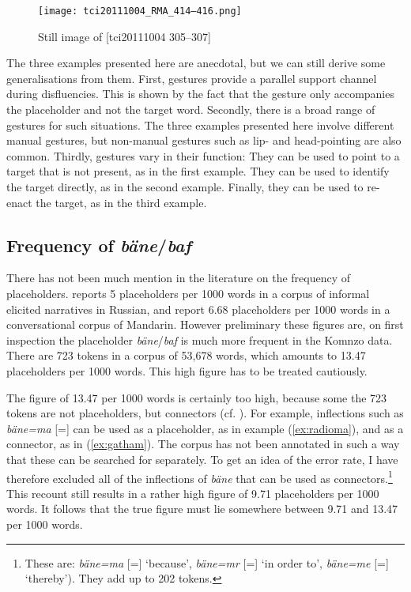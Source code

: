 \documentclass[output=paper,colorlinks,citecolor=brown]{langscibook}
\begin{document}
\begin{figure}
    \texttt{[image: tci20111004\_RMA\_414–416.png]}
    \caption{Still image of [tci20111004  305--307]}
    \label{fig:doehler:pictask-1-still}
\end{figure}

The three examples presented here are anecdotal, but we can still derive some generalisations from them. First, gestures provide a parallel support channel during disfluencies. This is shown by the fact that the gesture only accompanies the placeholder and not the target word. Secondly, there is a broad range of gestures for such situations. The three examples presented here involve different manual gestures, but non-manual gestures such as lip- and head-pointing are also common. Thirdly, gestures vary in their function: They can be used to point to a target that is not present, as in the first example. They can be used to identify the target directly, as in the second example. Finally, they can be used to re-enact the target, as in the third example.

\subsection{Frequency of \textit{bäne}/\textit{baf}}\label{sec:doehler:freq}

There has not been much mention in the literature on the frequency of placeholders. \textcite{Podlesskaya:2010aa} reports 5 placeholders per 1000 words in a corpus of informal elicited narratives in Russian, and \textcite{Zhao:2010sf} report 6.68 placeholders per 1000 words in a conversational corpus of Mandarin. However preliminary these figures are, on first inspection the placeholder \textit{bäne}/\textit{baf} is much more frequent in the Komnzo data. There are 723 tokens in a corpus of 53,678 words, which amounts to 13.47 placeholders per 1000 words. This high figure has to be treated cautiously.

The figure of 13.47 per 1000 words is certainly too high, because some the 723 tokens are not placeholders, but connectors (cf. ). For example, inflections such as \textit{bäne=ma} [=] can be used as a placeholder, as in example (\ref{ex:radioma}), and as a connector, as in (\ref{ex:gatham}). The corpus has not been annotated in such a way that these can be searched for separately. To get an idea of the error rate, I have therefore excluded all of the inflections of \textit{bäne} that can be used as connectors.\footnote{These are: \textit{bäne=ma} [=] `because', \textit{bäne=mr} [=] `in order to', \textit{bäne=me} [=] `thereby'). They add up to 202 tokens.} This recount still results in a rather high figure of 9.71 placeholders per 1000 words. It follows that the true figure must lie somewhere between 9.71 and 13.47 per 1000 words.
\end{document}
